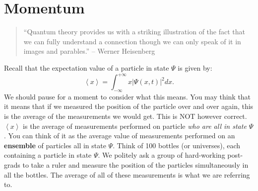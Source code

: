 \documentclass{article}
\begin{document}
\section{Momentum}
\begin{quote}
``Quantum theory provides us with a striking illustration of the fact that we can fully understand a connection though we can only speak of it in images and parables.'' -- Werner Heisenberg
\end{quote}
Recall that the expectation value of a particle in state $\Psi$ is given by:
\begin{equation}
\left< x \right> = \int_{-\infty}^{+\infty} x | \Psi (x,t) |^{2} dx.
\end{equation}
We should pause for a moment to consider what this means. You may think that it means that if we measured the position of the particle over and over again, this is the average of the measurements we would get. This is NOT however correct. $\left< x \right>$ is the average of measurements performed on particle \emph{who are all in state $\Psi$}. You can think of it as the average value of measurements performed on an \textbf{ensemble} of particles all in state $\Psi$. Think of 100 bottles (or universes), each containing a particle in state $\Psi$. We politely ask a group of hard-working post-grads to take a ruler and measure the position of the particles simultaneously in all the bottles. The average of all of these measurements is what we are referring to.
\end{document}
